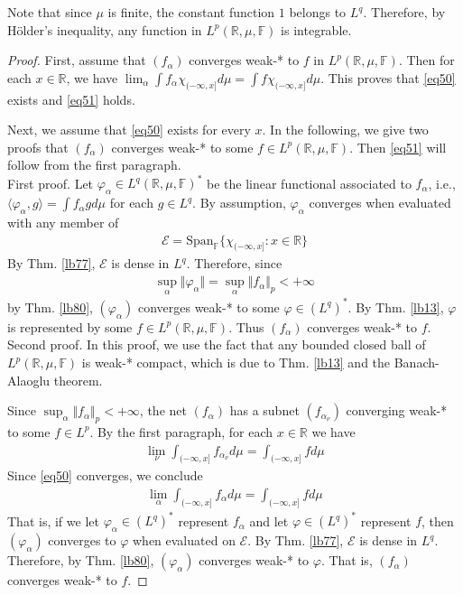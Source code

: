 \documentclass[12pt,b5paper,notitlepage]{article}
\theoremstyle{definition}
\theoremstyle{plain}
\newcommand{\mc}{\mathcal}
\newcommand{\Span}{\mathrm{Span}}
\newcommand{\bk}[1]{\langle {#1}\rangle}
\newcommand{\Rbb}{\mathbb R}
\newcommand{\Fbb}{\mathbb F}
\numberwithin{equation}{section}
\begin{document}
Note that since $\mu$ is finite, the constant function $1$ belongs to $L^q$. Therefore, by H\"older's inequality, any function in $L^p(\Rbb,\mu,\Fbb)$ is integrable.

\begin{proof}
First, assume that $(f_\alpha)$ converges weak-* to $f$ in $L^p(\Rbb,\mu,\Fbb)$. Then for each $x\in\Rbb$, we have $\lim_\alpha \int f_\alpha\chi_{(-\infty,x]}d\mu=\int f\chi_{(-\infty,x]}d\mu$. This proves that \eqref{eq50} exists and \eqref{eq51} holds.

Next, we assume that \eqref{eq50} exists for every $x$. In the following, we give two proofs that $(f_\alpha)$ converges weak-* to some $f\in L^p(\Rbb,\mu,\Fbb)$. Then \eqref{eq51} will follow from the first paragraph.\\[-1ex]

First proof. Let $\varphi_\alpha\in L^q(\Rbb,\mu,\Fbb)^*$ be the linear functional associated to $f_\alpha$, i.e., $\bk{\varphi_\alpha,g}=\int f_\alpha gd\mu$ for each $g\in L^q$. By assumption, $\varphi_\alpha$ converges when evaluated with any member of
\begin{align*}
\mc E=\Span_\Fbb\{\chi_{(-\infty,x]}:x\in\Rbb\}
\end{align*}
By Thm. \ref{lb77}, $\mc E$ is dense in $L^q$. Therefore, since
\begin{align*}
\sup_\alpha\Vert\varphi_\alpha\Vert=\sup_\alpha \Vert f_\alpha\Vert_p<+\infty
\end{align*}
by Thm. \ref{lb80}, $(\varphi_\alpha)$ converges weak-* to some $\varphi\in (L^q)^*$. By Thm. \ref{lb13}, $\varphi$ is represented by some $f\in L^p(\Rbb,\mu,\Fbb)$. Thus $(f_\alpha)$ converges weak-* to $f$.\\[-1ex]

Second proof. In this proof, we use the fact that any bounded closed ball of $L^p(\Rbb,\mu,\Fbb)$ is weak-* compact, which is due to Thm. \ref{lb13} and the Banach-Alaoglu theorem.  

Since $\sup_\alpha \Vert f_\alpha\Vert_p<+\infty$, the net $(f_\alpha)$ has a subnet $(f_{\alpha_\nu})$ converging weak-* to some $f\in L^p$. By the first paragraph, for each $x\in\Rbb$ we have
\begin{align*}
\lim_\nu\int_{(-\infty,x]}f_{\alpha_\nu} d\mu=\int_{(-\infty,x]}fd\mu
\end{align*} 
Since \eqref{eq50} converges, we conclude
\begin{align*}
\lim_\alpha\int_{(-\infty,x]}f_\alpha d\mu=\int_{(-\infty,x]}fd\mu
\end{align*} 
That is, if we let $\varphi_\alpha\in(L^q)^*$ represent $f_\alpha$ and let $\varphi\in(L^q)^*$ represent $f$, then $(\varphi_\alpha)$ converges to $\varphi$ when evaluated on $\mc E$. By Thm. \ref{lb77}, $\mc E$ is dense in $L^q$. Therefore, by Thm. \ref{lb80}, $(\varphi_\alpha)$ converges weak-* to $\varphi$. That is, $(f_\alpha)$ converges weak-* to $f$. 
\end{proof}
\end{document}

